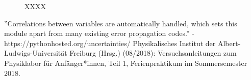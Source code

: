 \documentclass[11pt,a4paper]{article}
\begin{document}
\begin{figure}[p]
\centering
\renewcommand\thefigure{BX}
\caption[XXXX]{XXXX}
\label{Abb:X}
\end{figure}

\begin{thebibliography}{9}
''Correlations between variables are automatically handled, which sets this module apart from many existing error propagation codes.'' - https://pythonhosted.org/uncertainties/
 Physikalisches Institut der Albert-Ludwigs-Universität Freiburg (Hrsg.) (08/2018): Versuchsanleitungen zum Physiklabor für Anfänger*innen, Teil 1, Ferienpraktikum im Sommersemester 2018.
\end{thebibliography}
\end{document}
